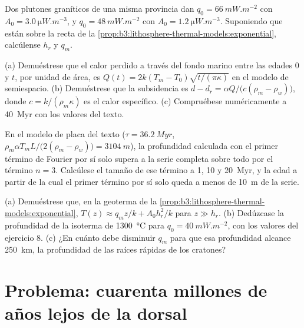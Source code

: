 \begin{exercise}[$\star\star$]\label{exo:b3:lithosphere-thermal-models:9}
Dos plutones graníticos de una misma provincia dan $q_0 = \qty{66}{mW.m^{-2}}$ con $A_0
= \qty{3.0}{\micro W.m^{-3}}$, y $q_0 = \qty{48}{mW.m^{-2}}$ con $A_0 =
\qty{1.2}{\micro W.m^{-3}}$. Suponiendo que están sobre la recta
de la \cref{prop:b3:lithosphere-thermal-models:exponential}, calcúlense $h_r$ y $q_m$.
\end{exercise}

\begin{exercise}[$\star\star\star$]\label{exo:b3:lithosphere-thermal-models:10}
(a) Demuéstrese que el calor perdido a través del fondo marino entre las edades 0 y $t$, por
unidad de área, es $Q(t) = 2k(T_m - T_0)\sqrt{t/(\pi\kappa)}$ en el modelo de
semiespacio. (b) Demuéstrese que la subsidencia es $d - d_r = \alpha Q/\bigl(c(\rho_m -
\rho_w)\bigr)$, donde $c = k/(\rho_m\kappa)$ es el calor específico. (c) Compruébese
numéricamente a \qty{40}{Myr} con los valores del texto.
\end{exercise}

\begin{exercise}[$\star\star\star$]\label{exo:b3:lithosphere-thermal-models:11}
En el modelo de placa del texto ($\tau = \qty{36.2}{Myr}$, $\rho_m\alpha T_mL/
\bigl(2(\rho_m - \rho_w)\bigr) = \qty{3104}{m}$), la profundidad calculada con el
primer término de Fourier por sí solo supera a la serie completa sobre todo por el término $n = 3$.
Calcúlese el tamaño de ese término a 1, 10 y \qty{20}{Myr}, y la edad a partir de la cual
el primer término por sí solo queda a menos de \qty{10}{m} de la serie.
\end{exercise}

\begin{exercise}[$\star\star\star$]\label{exo:b3:lithosphere-thermal-models:12}
(a) Demuéstrese que, en la geoterma de la \cref{prop:b3:lithosphere-thermal-models:exponential},
$T(z) \approx q_mz/k + A_0h_r^2/k$ para $z \gg h_r$. (b) Dedúzcase la profundidad de la
isoterma de \qty{1300}{\celsius} para $q_0 = \qty{40}{mW.m^{-2}}$, con los valores
del ejercicio 8. (c) ¿En cuánto debe disminuir $q_m$ para que esa profundidad alcance
\qty{250}{km}, la profundidad de las raíces rápidas de los cratones?
\end{exercise}

\section{Problema: cuarenta millones de años lejos de la dorsal}

